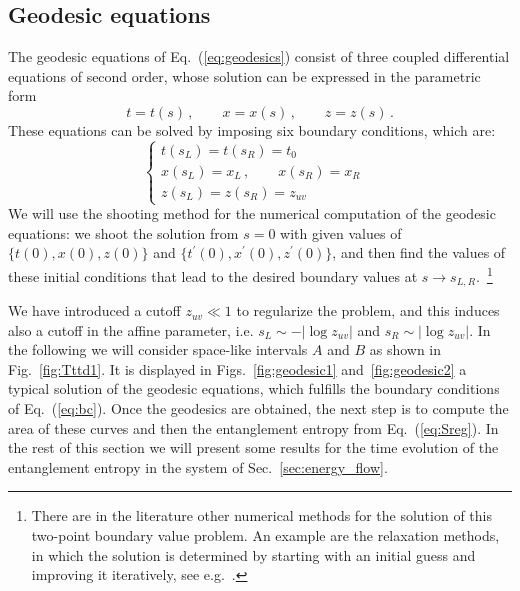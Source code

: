\documentclass[epj]{webofc}
\begin{document}
\subsection{Geodesic equations}
\label{subsec:geodesic_equations}

The geodesic equations of Eq.~(\ref{eq:geodesics}) consist of three coupled differential equations of second order, whose solution can be expressed in the parametric form
\begin{equation}
t= t(s) \,, \qquad x = x(s) \,, \qquad z=z(s) \,. 
\end{equation}
These equations can be solved by imposing six boundary conditions, which are:
\begin{equation}
\begin{cases}
t(s_L) = t(s_R) = t_0       &   \\
x(s_L) = x_L \,, \qquad x(s_R) = x_R    &   \\
z(s_L) = z(s_R) = z_{uv}      &  
\end{cases} \label{eq:bc}
\end{equation}
We will use the shooting method for the numerical computation of the geodesic equations: we shoot the solution from $s=0$ with given values of $\{t(0),x(0),z(0)\}$ and $\{t^\prime(0),x^\prime(0),z^\prime(0)\}$, and then find the values of these initial conditions that lead to the desired boundary values at $s \to s_{L,R}$.~\footnote{There are in the literature other numerical methods for the solution of this two-point boundary value problem. An example are the relaxation methods, in which the solution is determined by starting with an initial guess and improving it iteratively, see e.g.~\cite{Ecker:2015kna}.}

We have introduced a cutoff $z_{uv} \ll 1$ to regularize the problem, and this induces also a cutoff in the affine parameter, i.e. $s_L \sim -|\log z_{uv}|$ and $s_R \sim |\log z_{uv}|$. In the following we will consider space-like intervals $A$ and $B$ as shown in Fig.~\ref{fig:Tttd1}. It is displayed in Figs.~\ref{fig:geodesic1} and~\ref{fig:geodesic2} a typical solution of the geodesic equations, which fulfills the boundary conditions of Eq.~(\ref{eq:bc}). Once the geodesics are obtained, the next step is to compute the area of these curves and then the entanglement entropy from Eq.~(\ref{eq:Sreg}). In the rest of this section we will present some results for the time evolution of the entanglement entropy in the system of Sec.~\ref{sec:energy_flow}.
\end{document}

